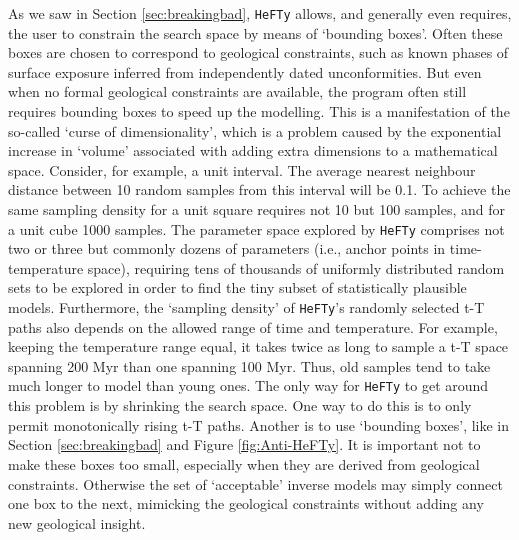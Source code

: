 \documentclass{article}
\begin{document}
As we saw in Section \ref{sec:breakingbad}, {\tt HeFTy} allows, and
generally even requires, the user to constrain the search space by
means of `bounding boxes'.  Often these boxes are chosen to correspond
to geological constraints, such as known phases of surface exposure
inferred from independently dated unconformities. But even when no
formal geological constraints are available, the program often still
requires bounding boxes to speed up the modelling.  This is a
manifestation of the so-called `curse of dimensionality', which is a
problem caused by the exponential increase in `volume' associated with
adding extra dimensions to a mathematical space. Consider, for
example, a unit interval. The average nearest neighbour distance
between 10 random samples from this interval will be 0.1. To achieve
the same sampling density for a unit square requires not 10 but 100
samples, and for a unit cube 1000 samples.  The parameter space
explored by {\tt HeFTy} comprises not two or three but commonly dozens
of parameters (i.e., anchor points in time-temperature space),
requiring tens of thousands of uniformly distributed random sets to be
explored in order to find the tiny subset of statistically plausible
models.  Furthermore, the `sampling density' of {\tt HeFTy}'s randomly
selected t-T paths also depends on the allowed range of time and
temperature. For example, keeping the temperature range equal, it
takes twice as long to sample a t-T space spanning 200 Myr than one
spanning 100 Myr. Thus, old samples tend to take much longer to model
than young ones. The only way for {\tt HeFTy} to get around this
problem is by shrinking the search space. One way to do this is to
only permit monotonically rising t-T paths. Another is to use
`bounding boxes', like in Section \ref{sec:breakingbad} and Figure
\ref{fig:Anti-HeFTy}.  It is important not to make these boxes too
small, especially when they are derived from geological
constraints. Otherwise the set of `acceptable' inverse models may
simply connect one box to the next, mimicking the geological
constraints without adding any new geological insight.\\
\end{document}
